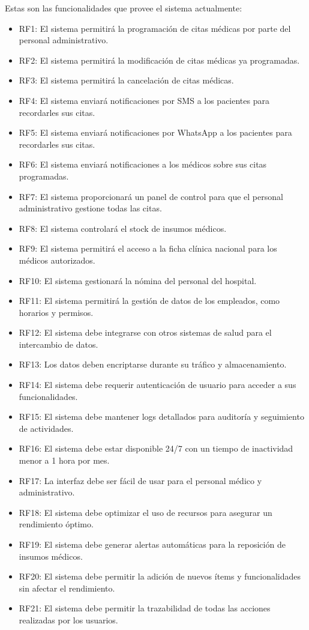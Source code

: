 Estas son las funcionalidades que provee el sistema actualmente: 
\begin{itemize}
    \item RF1: El sistema permitirá la programación de citas médicas por parte del personal administrativo.
    \item RF2: El sistema permitirá la modificación de citas médicas ya programadas.
    \item RF3: El sistema permitirá la cancelación de citas médicas.
    \item RF4: El sistema enviará notificaciones por SMS a los pacientes para recordarles sus citas.
    \item RF5: El sistema enviará notificaciones por WhatsApp a los pacientes para recordarles sus citas.
    \item RF6: El sistema enviará notificaciones a los médicos sobre sus citas programadas.
    \item RF7: El sistema proporcionará un panel de control para que el personal administrativo gestione todas las citas.
    \item RF8: El sistema controlará el stock de insumos médicos.
    \item RF9: El sistema permitirá el acceso a la ficha clínica nacional para los médicos autorizados.
    \item RF10: El sistema gestionará la nómina del personal del hospital.
    \item RF11: El sistema permitirá la gestión de datos de los empleados, como horarios y permisos.
    \item RF12: El sistema debe integrarse con otros sistemas de salud para el intercambio de datos.
    \item RF13: Los datos deben encriptarse durante su tráfico y almacenamiento.
    \item RF14: El sistema debe requerir autenticación de usuario para acceder a sus funcionalidades.
    \item RF15: El sistema debe mantener logs detallados para auditoría y seguimiento de actividades.
    \item RF16: El sistema debe estar disponible 24/7 con un tiempo de inactividad menor a 1 hora por mes.
    \item RF17: La interfaz debe ser fácil de usar para el personal médico y administrativo.
    \item RF18: El sistema debe optimizar el uso de recursos para asegurar un rendimiento óptimo.
    \item RF19: El sistema debe generar alertas automáticas para la reposición de insumos médicos.
    \item RF20: El sistema debe permitir la adición de nuevos ítems y funcionalidades sin afectar el rendimiento.
    \item RF21: El sistema debe permitir la trazabilidad de todas las acciones realizadas por los usuarios.
\end{itemize}



